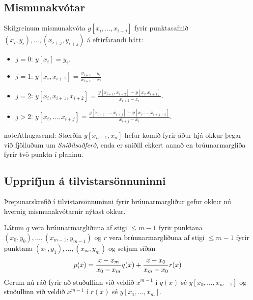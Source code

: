 \documentclass[A4paper,10pt,icelandic]{sphinxmanual}
\begin{document}
\subsection{Mismunakvótar}
\label{kafli03:mismunakvotar}\label{kafli03:index-9}
Skilgreinum mismunakvóta \(y[x_i,\ldots,x_{i+j}]\) fyrir
punktasafnið \((x_i,y_i),\ldots,(x_{i+j},y_{i+j})\) á eftirfarandi
hátt:
\begin{itemize}
\item {} 
\(j=0\): \(y[x_i] = y_i\).

\item {} 
\(j=1\): \(y[x_i,x_{i+1}] = \frac{y_{i+1}-y_i}{x_{i+1}-x_i}\)

\item {} 
\(j=2\):
\(y[x_i,x_{i+1},x_{i+2}] = \frac{y[x_{i+1},x_{i+2}] - y[x_i,x_{i+1}]}{x_{i+2}-x_i}\).

\item {} 
\(j>2\):
\(y[x_i,\ldots,x_{i+j}] = \frac{y[x_{i+1},\ldots,x_{i+j}] - y[x_i,\ldots,x_{i+j-1}]}{x_{i+j}-x_i}\).

\end{itemize}

\begin{notice}{note}{Athugasemd:}
Stærðin \(y[x_{n-1},x_n]\) hefur komið fyrir áður
hjá okkur þegar við fjölluðum um \emph{Sniðilsaðferð}, enda er sniðill
ekkert annað en brúunarmargliða fyrir tvö punkta í planinu.
\end{notice}


\subsection{Upprifjun á tilvistarsönnuninni}
\label{kafli03:upprifjun-a-tilvistarsonnuninni}
Þrepunarskrefið í tilvistarsönnuninni
fyrir brúunarmargliður gefur okkur nú hvernig mismunakvótarnir nýtast okkur.

Látum \(q\) vera brúunarmargliðuna af stigi \(\leq m-1\) fyrir
punktana \((x_0,y_0), \ldots,
(x_{m-1},y_{m-1})\) og \(r\) vera brúunarmargliðuna af stigi
\(\leq m-1\) fyrir punktana \((x_1,y_1), \ldots, (x_m,y_m)\) og
setjum síðan
\begin{gather}
\begin{split}p(x) = \frac{x-x_m}{x_0-x_m}q(x) + \frac{x-x_0}{x_m-x_0}r(x)\end{split}\notag
\end{gather}
Gerum nú ráð fyrir að stuðullinn við veldið \(x^{m-1}\) í
\(q(x)\) sé \(y[x_0, \ldots, x_{m-1}]\) og stuðullinn við veldið
\(x^{m-1}\) í \(r(x)\) sé \(y[x_1, \ldots, x_m]\).
\end{document}
